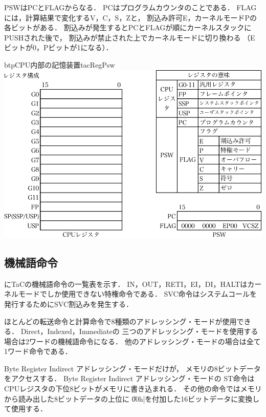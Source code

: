 PSWはPCとFLAGからなる．
PCはプログラムカウンタのことである．
FLAGには，計算結果で変化するV，C，S，Zと，
割込み許可E，カーネルモードPの各ビットがある．
割込みが発生するとPCとFLAGが順にカーネルスタックにPUSHされた後で，
割込みが禁止された上でカーネルモードに切り換わる
（Eビットが0，Pビットが1になる）．

\begin{myfig}{btp}{CPU内部の記憶装置}{tacRegPsw}
  \includegraphics[scale=0.7]{Tbl/TaC7a-instruction-p1-3-crop.pdf}
\end{myfig}

\subsection{機械語命令}
にTaCの機械語命令の一覧表を示す．
IN，OUT，RETI，EI，DI，HALTはカーネルモードでしか使用できない特権命令である．
SVC命令はシステムコールを発行するためにSVC割込みを発生する．

ほとんどの転送命令と計算命令で8種類のアドレッシング・モードが使用できる．
Direct，Indexed，Immediateの
三つのアドレッシング・モードを使用する場合は2ワードの機械語命令になる．
他のアドレッシング・モードの場合は全て1ワード命令である．

Byte Register Indirect アドレッシング・モードだけが，
メモリの8ビットデータをアクセスする．
Byte Register Indirect アドレッシング・モードの
ST命令はCPUレジスタの下位8ビットがメモリに書き込まれる．
その他の命令ではメモリから読み出した8ビットデータの上位に
\|00h|を付加した16ビットデータに変換して使用する．

